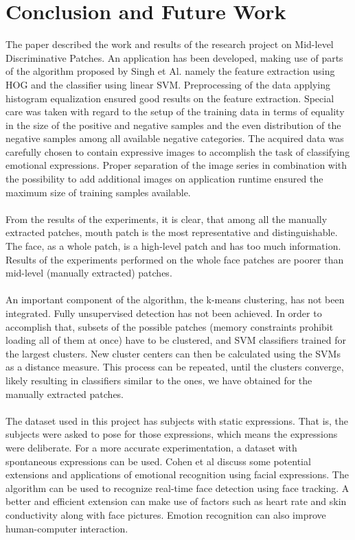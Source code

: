 \section{Conclusion and Future Work}

The paper described the work and results of the research project on Mid-level Discriminative Patches. An application has been developed, making use of parts of the algorithm proposed by Singh et Al. \cite{Singh2012DiscPat} namely the feature extraction using HOG and the classifier using linear SVM. Preprocessing of the data applying histogram equalization ensured good results on the feature extraction. Special care was taken with regard to the setup of the training data in terms of equality in the size of the positive and negative samples and the even distribution of the negative samples among all available negative categories. The acquired data was carefully chosen to contain expressive images to accomplish the task of classifying emotional expressions. Proper separation of the image series in combination with the possibility to add additional images on application runtime ensured the maximum size of training samples available.
\\
\\
From the results of the experiments, it is clear, that among all the manually extracted patches, mouth patch is the most representative and distinguishable. The face, as a whole patch, is a high-level patch and has too much information. Results of the experiments performed on the whole face patches are poorer than mid-level (manually extracted) patches. 
\\
\\
An important component of the algorithm, the k-means clustering, has not been integrated. Fully unsupervised detection has not been achieved. In order to accomplish that, subsets of the possible patches (memory constraints prohibit loading all of them at once) have to be clustered, and SVM classifiers trained for the largest clusters. New cluster centers can then be calculated using the SVMs as a distance measure. This process can be repeated, until the clusters converge, likely resulting in classifiers similar to the ones, we have obtained for the manually extracted patches.
\\
\\
The dataset used in this project has subjects with static expressions. That is, the subjects were asked to pose for those expressions, which means the expressions were deliberate. For a more accurate experimentation, a dataset with spontaneous expressions can be used. Cohen et al \cite{cohen2000emotion} discuss some potential extensions and applications of emotional recognition using facial expressions. The algorithm can be used to recognize real-time face detection using face tracking. A better and efficient extension can make use of factors such as heart rate and skin conductivity along with face pictures. Emotion recognition can also improve human-computer interaction. 

